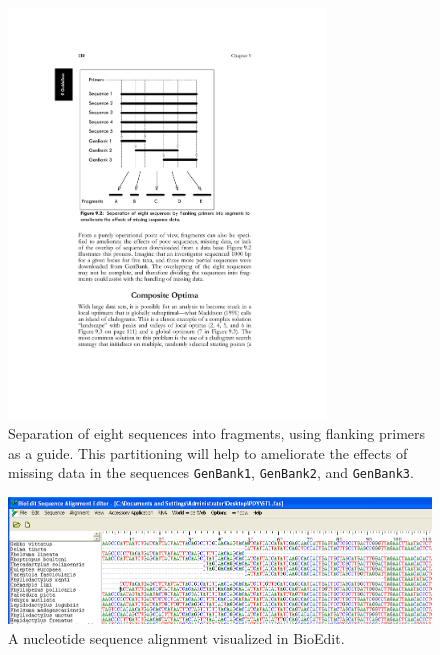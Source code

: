 \begin{figure}[htpb!]
\begin{center}
\includegraphics[width=0.75\textwidth]{doc/figures/primer_chop.pdf}
\end{center}
\caption{Separation of eight sequences into fragments, using flanking primers 
as a guide.  This partitioning will help to ameliorate the effects of missing data in the
sequences \texttt{GenBank1}, \texttt{GenBank2}, and \texttt{GenBank3}.}
\label{fig:primer_chop}
\end{figure}



\begin{figure}[htpb!]
\begin{center}
\includegraphics[width=1.0\textwidth]{doc/figures/messyseq_prechop.pdf}
\end{center}
\caption{A nucleotide sequence alignment visualized in BioEdit.}
\label{fig:messyseq_prechop}
\end{figure}

